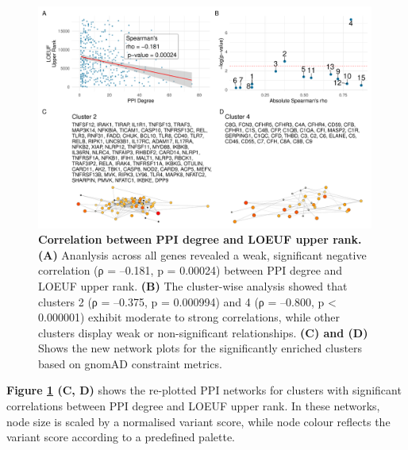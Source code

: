 \begin{figure}[ht]
  \centering
  \includegraphics[width=0.99\textwidth]{../images/untangleR_ppi_network_p_cor_spear_rho_sig_clust_patch3.pdf}
  \caption{
    \textbf{Correlation between PPI degree and LOEUF upper rank.} 
    \textbf{(A)} Ananlysis across all genes revealed a weak, significant negative correlation (ρ = –0.181, p = 0.00024) between PPI degree and LOEUF upper rank. \textbf{(B)} The cluster-wise analysis showed that clusters 2 (ρ = –0.375, p = 0.000994) and 4 (ρ = –0.800, p < 0.000001) exhibit moderate to strong correlations, while other clusters display weak or non-significant relationships. \textbf{(C) and (D)} Shows the new network plots for the significantly enriched clusters based on gnomAD constraint metrics.
  }
  \label{fig:p_cor_spear_rho_sig_clust_patch3}
\end{figure}

\textbf{Figure \ref{fig:p_cor_spear_rho_sig_clust_patch3} (C, D)} shows the re-plotted PPI networks for clusters with significant correlations between PPI degree and LOEUF upper rank. In these networks, node size is scaled by a normalised variant score, while node colour reflects the variant score according to a predefined palette.

